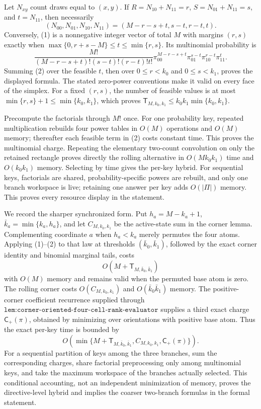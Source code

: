 Let \(N_{xy}\) count draws equal to \((x,y)\). If \(R=N_{10}+N_{11}=r\), \(S=N_{01}+N_{11}=s\), and \(t=N_{11}\), then necessarily
\[
(N_{00},N_{01},N_{10},N_{11})=(M-r-s+t,s-t,r-t,t).
\tag{1}
\]
Conversely, (1) is a nonnegative integer vector of total \(M\) with margins \((r,s)\) exactly when \(\max\{0,r+s-M\}\le t\le\min\{r,s\}\). Its multinomial probability is
\[
\frac{M!}{(M-r-s+t)!(s-t)!(r-t)!t!}\pi_{00}^{M-r-s+t}\pi_{01}^{s-t}\pi_{10}^{r-t}\pi_{11}^{t}.
\tag{2}
\]
Summing (2) over the feasible \(t\), then over \(0\le r<k_0\) and \(0\le s<k_1\), proves the displayed formula. The stated zero-power conventions make it valid on every face of the simplex. For a fixed \((r,s)\), the number of feasible values is at most \(\min\{r,s\}+1\le\min\{k_0,k_1\}\), which proves \(\mathsf T_{M,k_0,k_1}\le k_0k_1\min\{k_0,k_1\}\).

Precompute the factorials through \(M!\) once. For one probability key, repeated multiplication rebuilds four power tables in \(O(M)\) operations and \(O(M)\) memory; thereafter each feasible term in (2) costs constant time. This proves the multinomial charge. Repeating the elementary two-count convolution on only the retained rectangle proves directly the rolling alternative in \(O(Mk_0k_1)\) time and \(O(k_0k_1)\) memory. Selecting by time gives the per-key hybrid. For sequential keys, factorials are shared, probability-specific powers are rebuilt, and only one branch workspace is live; retaining one answer per key adds \(O(|\Pi|)\) memory. This proves every resource display in the statement.

We record the sharper synchronized form. Put \(h_a=M-k_a+1\), \(\bar k_a=\min\{k_a,h_a\}\), and let \(C_{M,k_0,k_1}\) be the active-state sum in the corner lemma. Complementing coordinate \(a\) when \(h_a<k_a\) merely permutes the four atoms. Applying (1)--(2) to that law at thresholds \((\bar k_0,\bar k_1)\), followed by the exact corner identity and binomial marginal tails, costs
\[
O\!\left(M+\mathsf T_{M,\bar k_0,\bar k_1}\right)
\tag{3}
\]
with \(O(M)\) memory and remains valid when the permuted base atom is zero. The rolling corner costs \(O(C_{M,k_0,k_1})\) and \(O(\bar k_0\bar k_1)\) memory. The positive-corner coefficient recurrence supplied through \(\texttt{lem:corner-oriented-four-cell-rank-evaluator}\) supplies a third exact charge \(\mathsf C_+(\pi)\), obtained by minimizing over orientations with positive base atom. Thus the exact per-key time is bounded by
\[
O\!\left(\min\{M+\mathsf T_{M,\bar k_0,\bar k_1},C_{M,k_0,k_1},\mathsf C_+(\pi)\}\right).
\tag{4}
\]
For a sequential partition of keys among the three branches, sum the corresponding charges, share factorial preprocessing only among multinomial keys, and take the maximum workspace of the branches actually selected. This conditional accounting, not an independent minimization of memory, proves the directive-level hybrid and implies the coarser two-branch formulas in the formal statement.